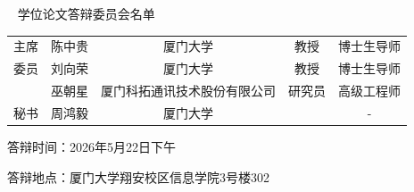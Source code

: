 


\begin{namelist}
\begin{center}
	~
	\vskip 0.1cm
	{\heiti {} 学位论文答辩委员会名单}
	\vskip 1cm
	\begin{tabularx}{\textwidth}{@{\extracolsep{\fill}}ccccc} 
		主席 & 陈中贵 & 厦门大学 & 教授 & 博士生导师\\ 
		委员 & 刘向荣 & 厦门大学 & 教授 & 博士生导师\\ 
			& 巫朝星 & 厦门科拓通讯技术股份有限公司 & 研究员 & 	高级工程师
            \\ 
		秘书 &  周鸿毅& 厦门大学 &  & -\\ 
	\end{tabularx}
\end{center}
\vspace{1cm}

\noindent 答辩时间：2026年5月22日下午

\noindent 答辩地点：厦门大学翔安校区信息学院3号楼302


\end{namelist}
